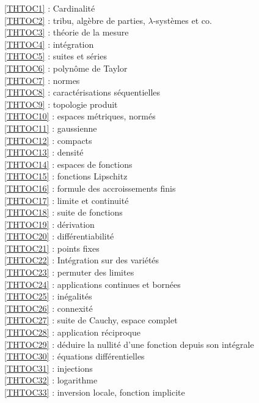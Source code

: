 \ref {THTOC1} : Cardinalité\\
\ref {THTOC2} : tribu, algèbre de parties, \( \lambda \)-systèmes et co.\\
\ref {THTOC3} : théorie de la mesure\\
\ref {THTOC4} : intégration\\
\ref {THTOC5} : suites et séries\\
\ref {THTOC6} : polynôme de Taylor\\
\ref {THTOC7} : normes\\
\ref {THTOC8} : caractérisations séquentielles\\
\ref {THTOC9} : topologie produit\\
\ref {THTOC10} : espaces métriques, normés\\
\ref {THTOC11} : gaussienne\\
\ref {THTOC12} : compacts\\
\ref {THTOC13} : densité\\
\ref {THTOC14} : espaces de fonctions\\
\ref {THTOC15} : fonctions Lipschitz\\
\ref {THTOC16} : formule des accroissements finis\\
\ref {THTOC17} : limite et continuité\\
\ref {THTOC18} : suite de fonctions\\
\ref {THTOC19} : dérivation\\
\ref {THTOC20} : différentiabilité\\
\ref {THTOC21} : points fixes\\
\ref {THTOC22} : Intégration sur des variétés\\
\ref {THTOC23} : permuter des limites\\
\ref {THTOC24} : applications continues et bornées\\
\ref {THTOC25} : inégalités\\
\ref {THTOC26} : connexité\\
\ref {THTOC27} : suite de Cauchy, espace complet\\
\ref {THTOC28} : application réciproque\\
\ref {THTOC29} : déduire la nullité d'une fonction depuis son intégrale\\
\ref {THTOC30} : équations différentielles\\
\ref {THTOC31} : injections\\
\ref {THTOC32} : logarithme\\
\ref {THTOC33} : inversion locale, fonction implicite\\
